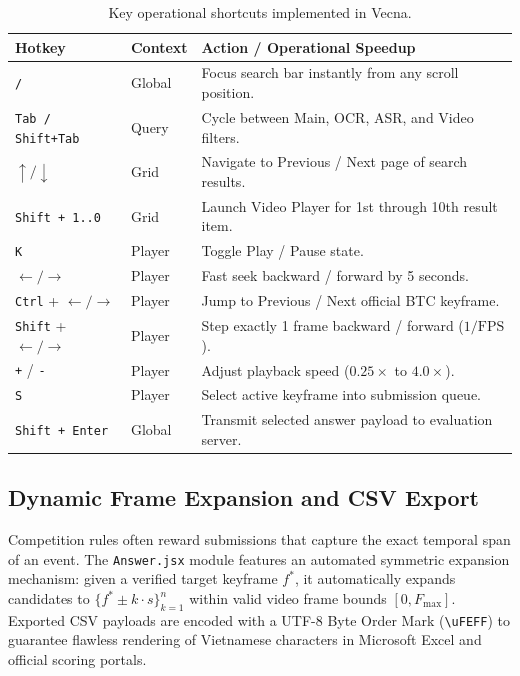 \documentclass[10pt,a4paper,twocolumn]{article}
\begin{document}
\begin{table}[t]
\caption{Key operational shortcuts implemented in Vecna.}
\label{tab:hotkeys}
\centering
\scriptsize
\begin{tabularx}{\columnwidth}{llX}
\toprule
\textbf{Hotkey} & \textbf{Context} & \textbf{Action / Operational Speedup} \\
\midrule
\texttt{/} & Global & Focus search bar instantly from any scroll position. \\
\texttt{Tab / Shift+Tab} & Query & Cycle between Main, OCR, ASR, and Video filters. \\
$\uparrow / \downarrow$ & Grid & Navigate to Previous / Next page of search results. \\
\texttt{Shift + 1..0} & Grid & Launch Video Player for 1st through 10th result item. \\
\texttt{K} & Player & Toggle Play / Pause state. \\
$\leftarrow / \rightarrow$ & Player & Fast seek backward / forward by 5 seconds. \\
\texttt{Ctrl} + $\leftarrow / \rightarrow$ & Player & Jump to Previous / Next official BTC keyframe. \\
\texttt{Shift} + $\leftarrow / \rightarrow$ & Player & Step exactly 1 frame backward / forward ($1/\text{FPS}$). \\
\texttt{+} / \texttt{-} & Player & Adjust playback speed ($0.25\times$ to $4.0\times$). \\
\texttt{S} & Player & Select active keyframe into submission queue. \\
\texttt{Shift + Enter} & Global & Transmit selected answer payload to evaluation server. \\
\bottomrule
\end{tabularx}
\vspace{-0.2cm}
\end{table}

\subsection{Dynamic Frame Expansion and CSV Export}
Competition rules often reward submissions that capture the exact temporal span of an event. The \texttt{Answer.jsx} module features an automated symmetric expansion mechanism: given a verified target keyframe $f^*$, it automatically expands candidates to $\{f^* \pm k \cdot s\}_{k=1}^{n}$ within valid video frame bounds $[0, F_{\text{max}}]$. Exported CSV payloads are encoded with a UTF-8 Byte Order Mark (\texttt{\textbackslash uFEFF}) to guarantee flawless rendering of Vietnamese characters in Microsoft Excel and official scoring portals.
\end{document}
